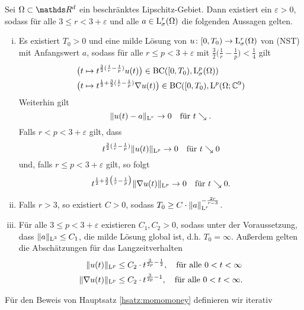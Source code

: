 \begin{hsatz}
  \label{hsatz:momomoney}
  Sei $\Omega \subset \R^d$ ein beschränktes Lipschitz-Gebiet.
  Dann existiert ein $\varepsilon > 0$, sodass für alle $3 \leq r < 3 + \varepsilon$ und alle $a \in \mathrm{L}_\sigma^r(\Omega)$ die folgenden Aussagen gelten.
  \begin{enumerate}[i)]
    \item Es existiert $T_0 > 0$ und eine milde Lösung von $u \colon [0,T_0) \to \mathrm{L}_\sigma^r(\Omega)$ von (NST) mit Anfangswert $a$, sodass für alle $r \leq p < 3 + \varepsilon$ mit $\frac{3}{2} \big( \frac{1}{r} - \frac{1}{p} \big) < \frac{1}{4}$ gilt
      \begin{align*}
        &\big( t \mapsto t^{\frac{3}{2}(\frac{1}{r} - \frac{1}{p})} u(t) \big) \in \mathrm{BC}([0,T_0), \mathrm{L}^p_\sigma(\Omega)) \\
        &\big( t \mapsto t^{\frac{1}{2} + \frac{3}{2}(\frac{1}{r} - \frac{1}{p})} \nabla u(t) \big) \in \mathrm{BC}([0,T_0), \mathrm{L}^p(\Omega; \mathbb{C}^9) 
      \end{align*}
      Weiterhin gilt
      $$
      \|u(t) - a \|_{\mathrm{L}^r} \to 0 \quad\text{für } t \searrow.
      $$
      Falls $r < p < 3 + \varepsilon$ gilt, dass 
      $$
      t^{\frac{3}{2}(\frac{1}{r} - \frac{1}{p})} \|u(t)\|_{\mathrm{L}^p} \to 0 \quad\text{für } t \searrow 0
      $$
      und, falls $r \leq p < 3 + \varepsilon$ gilt, so folgt
      $$
      t^{\frac{1}{2} + \frac{3}{2}\big( \frac{1}{r} - \frac{1}{p} \big)} \|\nabla u (t) \|_{\mathrm{L}^p} \to 0 \quad\text{für } t \searrow 0.
      $$

    \item Falls $r > 3$, so existiert $C > 0$, sodass $T_0 \geq C \cdot \|a\|_{\mathrm{L}^r}^{-\frac{2r}{r - 3}}$.
    \item Für alle $3 \leq p < 3 + \varepsilon$ existieren $C_1, C_2 > 0$, sodass unter der Voraussetzung, dass $\|a\|_{\mathrm{L}^3} \leq C_1$, die milde Lösung global ist, d.h. $T_0 = \infty$.
      Außerdem gelten die Abschätzungen für das Langzeitverhalten
      \begin{align*}
        \|u(t)\|_{\mathrm{L}^p} &\leq C_2 \cdot t^{\frac{3}{2p} - \frac{1}{2}}, \quad\text{für alle } 0 < t < \infty \\
        \|\nabla u(t) \|_{\mathrm{L}^p} &\leq C_2 \cdot t^{\frac{3}{2p} - 1}, \quad\text{für alle } 0 < t < \infty.
      \end{align*}
  \end{enumerate}
\end{hsatz}
Für den Beweis von Hauptsatz \ref{hsatz:momomoney} definieren wir iterativ
